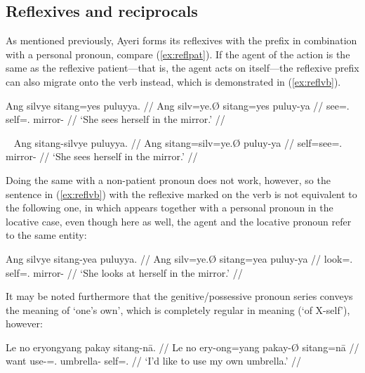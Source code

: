 
\subsection{Reflexives and reciprocals}
\label{subsec:reflrec}

As mentioned previously, Ayeri forms its reflexives with the prefix 
 in combination with a personal pronoun, compare 
(\ref{ex:reflpat}). If the agent of the action is the same as the reflexive 
patient---that is, the agent acts on itself---the reflexive prefix can also 
migrate onto the verb instead, which is demonstrated in (\ref{ex:reflvb}).

\ex\label{ex:reflpat}\begingl
	\gla Ang silvye sitang=yes puluyya. //
	\glb Ang silv=ye.Ø sitang=yes puluy-ya //
	\glc \AgtT{} see=\TsgF{}.\Top{} self=\TsgF{}.\Parg{} mirror-\Loc{} //
	\glft `She sees herself in the mirror.' //
\endgl\xe

\ex~\label{ex:reflvb}\begingl
	\gla Ang sitang-silvye puluyya. //
	\glb Ang sitang=silv=ye.Ø puluy-ya //
	\glc \AgtT{} self=see=\TsgF{}.\Top{} mirror-\Loc{} //
	\glft `She sees herself in the mirror.' //
\endgl\xe

Doing the same with a non-patient pronoun does not work, however, so the 
sentence in (\ref{ex:reflvb}) with the reflexive  marked 
on the verb is not equivalent to the following one, in which 
 appears together with a personal pronoun in the locative 
case, even though here as well, the agent and the locative pronoun refer to the 
same entity:

\ex\label{ex:reflloc}\begingl
	\gla Ang silvye sitang-yea puluyya. //
	\glb Ang silv=ye.Ø sitang=yea puluy-ya //
	\glc \AgtT{} look=\TsgF{}.\Top{} self=\TsgF{}.\Loc{} mirror-\Loc{} //
	\glft `She looks at herself in the mirror.' //
\endgl\xe

It may be noted furthermore that the genitive/possessive pronoun series conveys 
the meaning of `one's own', which is completely regular in meaning (`of 
X-self'), however:

\ex\begingl
	\gla Le no eryongyang pakay sitang-nā. //
	\glb Le no ery-ong=yang pakay-Ø sitang=nā //
	\glc \PatTI{} want use-\Irr{}=\Fsg{}.\Aarg{} umbrella-\Top{} 
		self=\Fsg{}.\Gen{} //
	\glft `I'd like to use my own umbrella.' //
\endgl\xe




